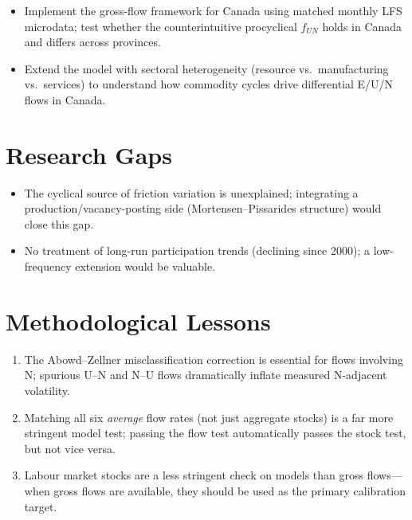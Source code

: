 \begin{itemize}
  \item Implement the gross-flow framework for Canada using matched monthly
    LFS microdata; test whether the counterintuitive procyclical $f_{UN}$
    holds in Canada and differs across provinces.
  \item Extend the model with sectoral heterogeneity (resource vs.\
    manufacturing vs.\ services) to understand how commodity cycles drive
    differential E/U/N flows in Canada.
\end{itemize}

\section{Research Gaps}

\begin{itemize}
  \item The cyclical source of friction variation is unexplained; integrating
    a production/vacancy-posting side (Mortensen--Pissarides structure) would
    close this gap.
  \item No treatment of long-run participation trends (declining since 2000);
    a low-frequency extension would be valuable.
\end{itemize}

\section{Methodological Lessons}

\begin{enumerate}
  \item The Abowd--Zellner misclassification correction is essential for
    flows involving N; spurious U--N and N--U flows dramatically inflate
    measured N-adjacent volatility.
  \item Matching all six \emph{average} flow rates (not just aggregate stocks)
    is a far more stringent model test; passing the flow test automatically
    passes the stock test, but not vice versa.
  \item Labour market stocks are a less stringent check on models than gross
    flows---when gross flows are available, they should be used as the primary
    calibration target.
\end{enumerate}

